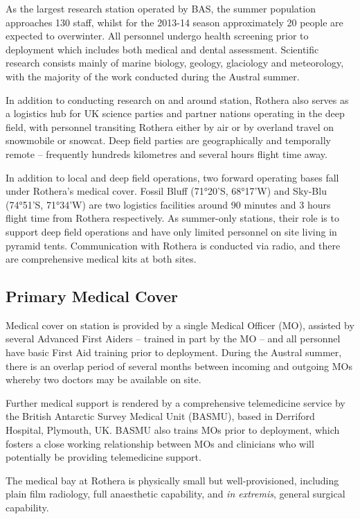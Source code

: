 \documentclass[12pt,a4paper]{article}
\begin{document}
As the largest research station operated by BAS, the summer population approaches 130 staff, whilst for the 2013-14 season approximately 20 people are expected to overwinter. All personnel undergo health screening prior to deployment which includes both medical and dental assessment. Scientific research consists mainly of marine biology, geology, glaciology and meteorology, with the majority of the work conducted during the Austral summer.

In addition to conducting research on and around station, Rothera also serves as a logistics hub for UK science parties and partner nations operating in the deep field, with personnel transiting Rothera either by air or by overland travel on snowmobile or snowcat. Deep field parties are geographically and temporally remote -- frequently hundreds kilometres and several hours flight time away.

In addition to local and deep field operations, two forward operating bases fall under Rothera's medical cover. Fossil Bluff (71°20'S, 68°17'W) and Sky-Blu (74°51'S, 71°34'W) are two logistics facilities around 90 minutes and 3 hours flight time from Rothera respectively. As summer-only stations, their role is to support deep field operations and have only limited personnel on site living in pyramid tents. Communication with Rothera is conducted via radio, and there are comprehensive medical kits at both sites.

\subsection{Primary Medical Cover}

Medical cover on station is provided by a single Medical Officer (MO), assisted by several Advanced First Aiders -- trained in part by the MO -- and all personnel have basic First Aid training prior to deployment. During the Austral summer, there is an overlap period of several months between incoming and outgoing MOs whereby two doctors may be available on site.

Further medical support is rendered by a comprehensive telemedicine service by the British Antarctic Survey Medical Unit (BASMU), based in Derriford Hospital, Plymouth, UK. BASMU also trains MOs prior to deployment, which fosters a close working relationship between MOs and clinicians who will potentially be providing telemedicine support.

The medical bay at Rothera is physically small but well-provisioned, including plain film radiology, full anaesthetic capability, and \emph{in extremis}, general surgical capability.
\end{document}
